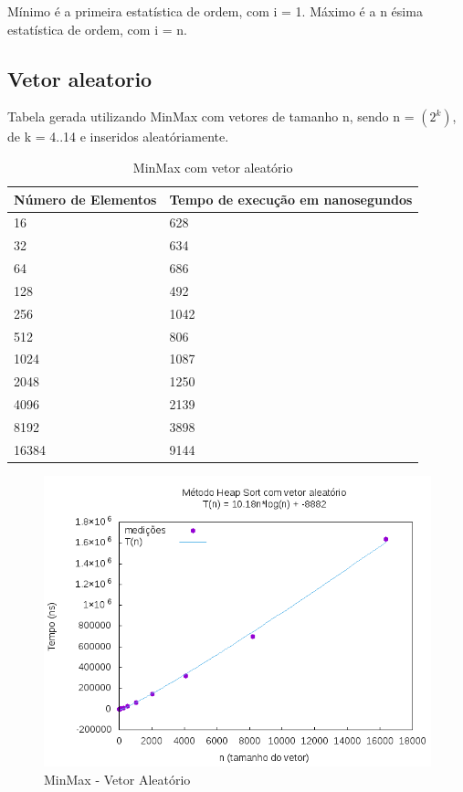 \documentclass[12pt,a4paper,twoside]{report}
\begin{document}
Mínimo é a primeira estatística de ordem, com i = 1.
Máximo é a n ésima estatística de ordem, com i = n.

\subsection{Vetor aleatorio}
Tabela gerada utilizando MinMax com vetores de tamanho n, sendo n = $(2^k)$, de k = 4..14 e inseridos aleatóriamente.
\begin{table}[H]
\centering
\caption{MinMax com vetor aleatório}
\label{my-label}
\begin{tabular}{|l|l|}
\hline
\multicolumn{1}{|c|}{\textbf{Número de Elementos}} & \multicolumn{1}{c|}{\textbf{Tempo de execução em nanosegundos}} \\ \hline
16 & 628 \\ \hline
32 & 634 \\ \hline
64 & 686 \\ \hline
128 & 492 \\ \hline
256 & 1042 \\ \hline
512 & 806 \\ \hline
1024 & 1087 \\ \hline
2048 & 1250 \\ \hline
4096 & 2139 \\ \hline
8192 & 3898 \\ \hline
16384 & 9144 \\ \hline
\end{tabular}
\end{table}

\begin{figure}[H]
    \centering
    \includegraphics[width=0.7\linewidth]{graficos/HeapSort/vIntAleatorio/vIntAleatorio.png}
  \caption{MinMax - Vetor Aleatório}
\end{figure}
\end{document}
